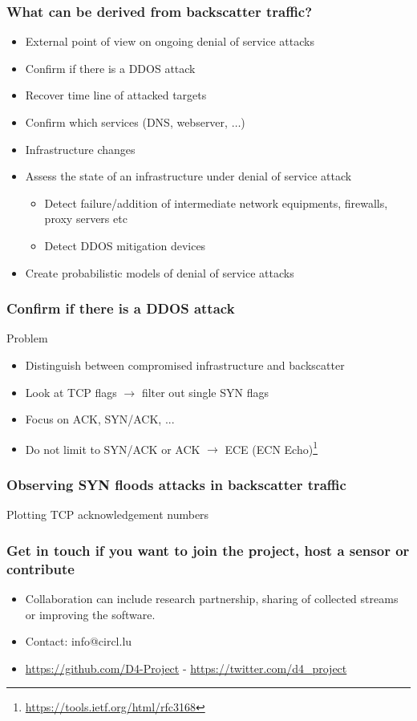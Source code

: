 \documentclass{beamer}
\begin{document}
\begin{frame}
\frametitle{What can be derived from backscatter traffic?}

\begin{itemize}
    \item External point of view on ongoing denial of service attacks
    \item Confirm if there is a DDOS attack
    \item Recover time line of attacked targets
    \item Confirm which services (DNS, webserver, $\dots$)
    \item Infrastructure changes
    \item Assess the state of an infrastructure under denial of service attack
    \begin{itemize}
        \item Detect failure/addition of  intermediate network equipments, firewalls, proxy servers etc
        \item Detect DDOS mitigation devices
    \end{itemize}
    \item Create probabilistic models of denial of service attacks
\end{itemize}
\end{frame}

\begin{frame}
    \frametitle{Confirm if there is a DDOS attack}
    \begin{block}{Problem}
        \begin{itemize}
            \item Distinguish between compromised infrastructure and backscatter
            \item Look at TCP flags $\to$ filter out single SYN flags
            \item Focus on ACK, SYN/ACK, ...
            \item Do not limit to SYN/ACK or ACK $\to$ ECE (ECN Echo)\footnote{\url{https://tools.ietf.org/html/rfc3168}}
        \end{itemize}
    \end{block}
    
\end{frame}

\begin{frame}
    \frametitle{Observing SYN floods attacks in backscatter traffic}
    Plotting TCP acknowledgement numbers
    \begin{center}
        \scalebox{0.7}{}
    \end{center}
\end{frame}

\begin{frame}
\frametitle{Get in touch if you want to join the project, host a sensor or contribute}
\begin{itemize}
\item Collaboration can include research partnership, sharing of collected streams or improving the software.
\item Contact: info@circl.lu
\item \url{https://github.com/D4-Project} -  \url{https://twitter.com/d4_project}
\end{itemize}
\end{frame}
\end{document}
